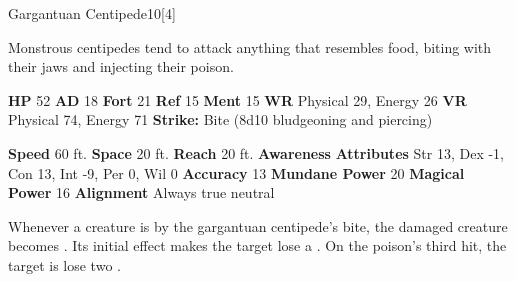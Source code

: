   
  \begin{monsection}{Gargantuan Centipede}{10}[4]
    \vspace{-1em}\vspace{-1em}
    \vspace{0em}

    
    Monstrous centipedes tend to attack anything that resembles food, biting with their jaws and injecting their poison.
  
    

    \begin{spellcontent}
      \begin{spelltargetinginfo}
        \pari \textbf{HP} 52 \monsep
          \textbf{AD} 18 \monsep
          \textbf{Fort} 21 \monsep
          \textbf{Ref} 15 \monsep
          \textbf{Ment} 15
        \pari \textbf{WR} Physical 29, Energy 26 \monsep
        \textbf{VR} Physical 74, Energy 71
        \pari \textbf{Strike:}
            Bite  (8d10 bludgeoning and piercing)
      \end{spelltargetinginfo}
    \end{spellcontent}
    \begin{monsterfooter}
      \pari \textbf{Speed} 60 ft. \monsep
        \textbf{Space} 20 ft. \monsep
        \textbf{Reach} 20 ft.
      \pari \textbf{Awareness} 
      \pari \textbf{Attributes}
        Str 13, Dex -1,
        Con 13, Int -9,
        Per 0, Wil 0
      \pari \textbf{Accuracy} 13 \monsep
        \textbf{Mundane Power} 20 \monsep
      \textbf{Magical Power} 16
      \pari \textbf{Alignment} Always true neutral
    \end{monsterfooter}
  \end{monsection}
    Whenever a creature is  by the gargantuan centipede's bite,
      the damaged creature becomes .
    Its initial effect makes the target lose a .
    On the poison's third hit, the target is lose two .
  

